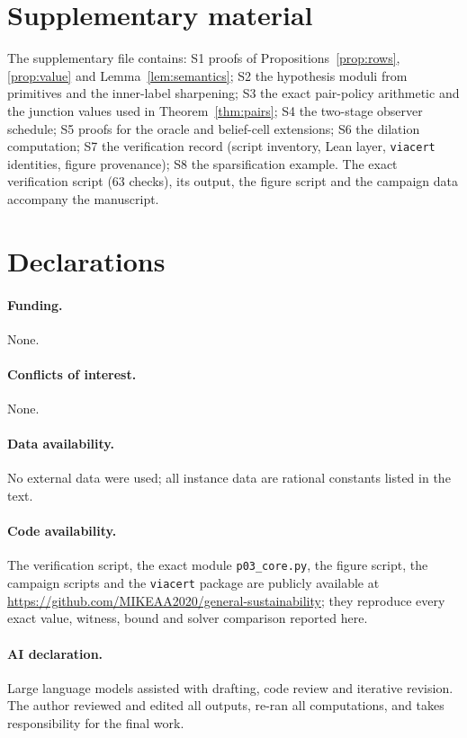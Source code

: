 \section*{Supplementary material}
The supplementary file  contains: S1 proofs of Propositions~\ref{prop:rows}, \ref{prop:value} and Lemma~\ref{lem:semantics}; S2 the hypothesis moduli from primitives and the inner-label sharpening; S3 the exact pair-policy arithmetic and the junction values used in Theorem~\ref{thm:pairs}; S4 the two-stage observer schedule; S5 proofs for the oracle and belief-cell extensions; S6 the dilation computation; S7 the verification record (script inventory, Lean layer, \texttt{viacert} identities, figure provenance); S8 the sparsification example. The exact verification script  (63 checks), its output, the figure script and the campaign data accompany the manuscript.

\section*{Declarations}
\paragraph{Funding.} None.
\paragraph{Conflicts of interest.} None.
\paragraph{Data availability.} No external data were used; all instance data are rational constants listed in the text.
\paragraph{Code availability.} The verification script, the exact module \texttt{p03\_core.py}, the figure script, the campaign scripts and the \texttt{viacert} package are publicly available at \url{https://github.com/MIKEAA2020/general-sustainability}; they reproduce every exact value, witness, bound and solver comparison reported here.
\paragraph{AI declaration.} Large language models assisted with drafting, code review and iterative revision. The author reviewed and edited all outputs, re-ran all computations, and takes responsibility for the final work.

